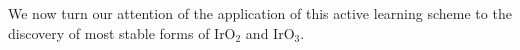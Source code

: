 




%
%
We now turn our attention of the application of this active learning scheme to the discovery of most stable forms of IrO$_2$ and IrO$_3$.

